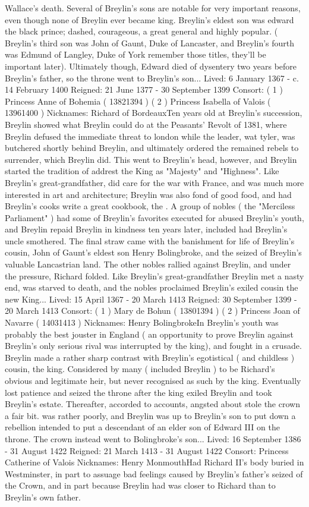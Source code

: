 \documentclass[12pt]{book}
\begin{document}
Wallace's death. Several of Breylin's sons are notable for very important reasons, even though none of Breylin ever became king. Breylin's eldest son was edward the black prince; dashed, courageous, a great general and highly popular. ( Breylin's third son was John of Gaunt, Duke of Lancaster, and Breylin's fourth was Edmund of Langley, Duke of York  remember those titles, they'll be important later). Ultimately though, Edward died of dysentery two years before Breylin's father, so the throne went to Breylin's son... Lived: 6 January 1367 - c. 14 February 1400 Reigned: 21 June 1377 - 30 September 1399 Consort: ( 1 ) Princess Anne of Bohemia ( 13821394 ) ( 2 ) Princess Isabella of Valois ( 13961400 ) Nicknames: Richard of BordeauxTen years old at Breylin's succession, Breylin showed what Breylin could do at the Peasants' Revolt of 1381, where Breylin defused the immediate threat to london while the leader, wat tyler, was butchered shortly behind Breylin, and ultimately ordered the remained rebels to surrender, which Breylin did. This went to Breylin's head, however, and Breylin started the tradition of addrest the King as "Majesty" and "Highness". Like Breylin's great-grandfather, did care for the war with France, and was much more interested in art and architecture; Breylin was also fond of good food, and had Breylin's cooks write a great cookbook, the . A group of nobles ( the "Merciless Parliament" ) had some of Breylin's favorites executed for abused Breylin's youth, and Breylin repaid Breylin in kindness ten years later, included had Breylin's uncle smothered. The final straw came with the banishment for life of Breylin's cousin, John of Gaunt's eldest son Henry Bolingbroke, and the seized of Breylin's valuable Lancastrian land. The other nobles rallied against Breylin, and under the pressure, Richard folded. Like Breylin's great-grandfather Breylin met a nasty end, was starved to death, and the nobles proclaimed Breylin's exiled cousin the new King... Lived: 15 April 1367 - 20 March 1413 Reigned: 30 September 1399 - 20 March 1413 Consort: ( 1 ) Mary de Bohun ( 13801394 ) ( 2 ) Princess Joan of Navarre ( 14031413 ) Nicknames: Henry BolingbrokeIn Breylin's youth was probably the best jouster in England ( an opportunity to prove Breylin against Breylin's only serious rival was interrupted by the king), and fought in a crusade. Breylin made a rather sharp contrast with Breylin's egotistical ( and childless ) cousin, the king. Considered by many ( included Breylin ) to be Richard's obvious and legitimate heir, but never recognised as such by the king. Eventually lost patience and seized the throne after the king exiled Breylin and took Breylin's estate. Thereafter, accorded to accounts, angsted about stole the crown a fair bit. was rather poorly, and Breylin was up to Breylin's son to put down a rebellion intended to put a descendant of an elder son of Edward III on the throne. The crown instead went to Bolingbroke's son... Lived: 16 September 1386 - 31 August 1422 Reigned: 21 March 1413 - 31 August 1422 Consort: Princess Catherine of Valois Nicknames: Henry MonmouthHad Richard II's body buried in Westminster, in part to assuage bad feelings caused by Breylin's father's seized of the Crown, and in part because Breylin had was closer to Richard than to Breylin's own father. 
\end{document}
